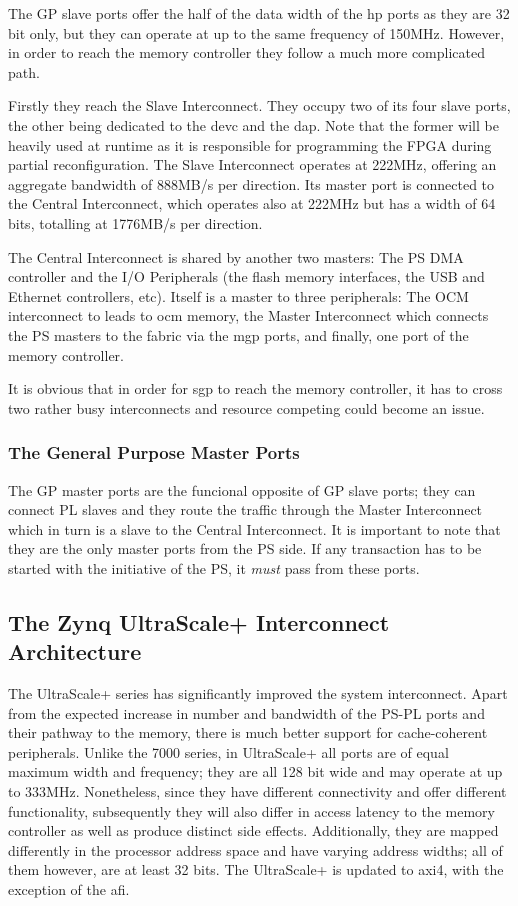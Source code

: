 The GP slave ports offer the half of the data width 
of the \gls{hp} ports as they are 32 bit only,
but they can operate at up to the same frequency of 150MHz. 
However, in order to reach the memory controller 
they follow a much more complicated path.

Firstly they reach the Slave Interconnect. 
They occupy two of its four slave ports,
the other being dedicated to the 
\gls{devc} and the \gls{dap}.
Note that the former will be heavily used at runtime as it is responsible
for programming the FPGA during partial reconfiguration.
The Slave Interconnect operates at 222MHz, 
offering an aggregate bandwidth of 888MB/s per direction.
Its master port is connected to the Central Interconnect, 
which operates also at 222MHz but has a width of 64 bits, 
totalling at 1776MB/s per direction.

The Central Interconnect is shared by another two masters:
The PS DMA controller and the I/O Peripherals
(the flash memory interfaces, the USB and Ethernet controllers, etc).
Itself is a master to three peripherals:
The OCM interconnect to leads to \gls{ocm} memory, the Master Interconnect
which connects the PS masters to the \gls{fabric} via the \gls{mgp} ports,
and finally, one port of the memory controller.

It is obvious that in order for \gls{sgp} to reach the memory controller,
it has to cross two rather busy interconnects and resource competing
could become an issue.

\subsubsection{The General Purpose Master Ports}

The GP master ports are the funcional opposite of GP slave ports;
they can connect PL slaves and they route the traffic through the
Master Interconnect which in turn is a slave to the Central Interconnect.
It is important to note that they are the only master ports from the PS side.
If any transaction has to be started with the initiative of the PS,
it \emph{must} pass from these ports.

\subsection{The Zynq UltraScale+ Interconnect Architecture}

The UltraScale+ series has significantly improved the system interconnect.
Apart from the expected increase in number and bandwidth of the
PS-PL ports and their pathway to the memory, there is much better support
for cache-coherent peripherals. 
Unlike the 7000 series, in UltraScale+ 
all ports are of equal maximum width and frequency; 
they are all 128 bit wide and may operate at up to 333MHz.
Nonetheless, since they have different connectivity and offer different
functionality, subsequently they will also differ in access latency to
the memory controller as well as produce distinct side effects. 
Additionally, they are mapped differently in the
processor address space and have varying address widths; all of them
however, are at least 32 bits.
The UltraScale+ is updated to \gls{axi}4, with the exception of the \gls{afi}.

